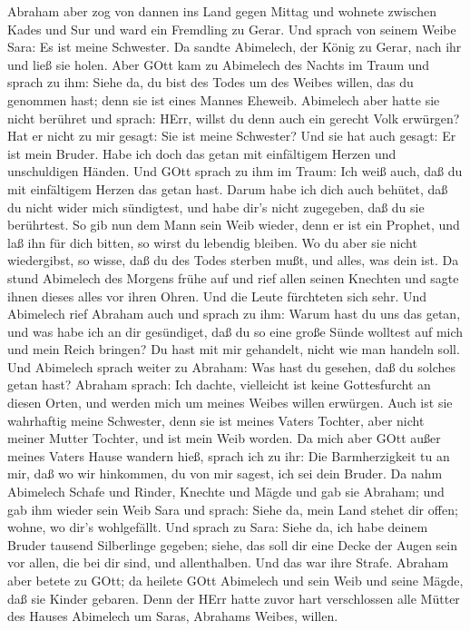  Abraham aber zog von dannen ins Land gegen Mittag und
wohnete zwischen Kades und Sur und ward ein Fremdling zu Gerar.
 Und sprach von seinem Weibe Sara: Es ist meine Schwester.
Da sandte Abimelech, der König zu Gerar, nach ihr und ließ sie holen.
 Aber GOtt kam zu Abimelech des Nachts im Traum und sprach
zu ihm: Siehe da, du bist des Todes um des Weibes willen, das du
genommen hast; denn sie ist eines Mannes Eheweib.  Abimelech
aber hatte sie nicht berühret und sprach: HErr, willst du denn auch ein
gerecht Volk erwürgen?  Hat er nicht zu mir gesagt: Sie ist
meine Schwester? Und sie hat auch gesagt: Er ist mein Bruder. Habe ich
doch das getan mit einfältigem Herzen und unschuldigen Händen.
 Und GOtt sprach zu ihm im Traum: Ich weiß auch, daß du mit
einfältigem Herzen das getan hast. Darum habe ich dich auch behütet, daß
du nicht wider mich sündigtest, und habe dir's nicht zugegeben, daß du
sie berührtest.  So gib nun dem Mann sein Weib wieder, denn
er ist ein Prophet, und laß ihn für dich bitten, so wirst du lebendig
bleiben. Wo du aber sie nicht wiedergibst, so wisse, daß du des Todes
sterben mußt, und alles, was dein ist.  Da stund Abimelech
des Morgens frühe auf und rief allen seinen Knechten und sagte ihnen
dieses alles vor ihren Ohren. Und die Leute fürchteten sich sehr.
 Und Abimelech rief Abraham auch und sprach zu ihm: Warum
hast du uns das getan, und was habe ich an dir gesündiget, daß du so
eine große Sünde wolltest auf mich und mein Reich bringen? Du hast mit
mir gehandelt, nicht wie man handeln soll.  Und Abimelech
sprach weiter zu Abraham: Was hast du gesehen, daß du solches getan
hast?  Abraham sprach: Ich dachte, vielleicht ist keine
Gottesfurcht an diesen Orten, und werden mich um meines Weibes willen
erwürgen.  Auch ist sie wahrhaftig meine Schwester, denn
sie ist meines Vaters Tochter, aber nicht meiner Mutter Tochter, und ist
mein Weib worden.  Da mich aber GOtt außer meines Vaters
Hause wandern hieß, sprach ich zu ihr: Die Barmherzigkeit tu an mir, daß
wo wir hinkommen, du von mir sagest, ich sei dein Bruder. 
Da nahm Abimelech Schafe und Rinder, Knechte und Mägde und gab sie
Abraham; und gab ihm wieder sein Weib Sara  und sprach:
Siehe da, mein Land stehet dir offen; wohne, wo dir's wohlgefällt.
 Und sprach zu Sara: Siehe da, ich habe deinem Bruder
tausend Silberlinge gegeben; siehe, das soll dir eine Decke der Augen
sein vor allen, die bei dir sind, und allenthalben. Und das war ihre
Strafe.  Abraham aber betete zu GOtt; da heilete GOtt
Abimelech und sein Weib und seine Mägde, daß sie Kinder gebaren.
 Denn der HErr hatte zuvor hart verschlossen alle Mütter
des Hauses Abimelech um Saras, Abrahams Weibes, willen.

